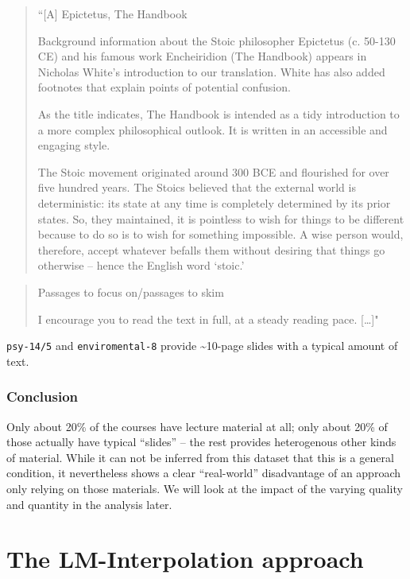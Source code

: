 \documentclass[]{article}
\begin{document}
\begin{quote}
``{[}A{]} Epictetus, The Handbook

Background information about the Stoic philosopher Epictetus (c. 50-130
CE) and his famous work Encheiridion (The Handbook) appears in Nicholas
White's introduction to our translation. White has also added footnotes
that explain points of potential confusion.

As the title indicates, The Handbook is intended as a tidy introduction
to a more complex philosophical outlook. It is written in an accessible
and engaging style.

The Stoic movement originated around 300 BCE and flourished for over
five hundred years. The Stoics believed that the external world is
deterministic: its state at any time is completely determined by its
prior states. So, they maintained, it is pointless to wish for things to
be different because to do so is to wish for something impossible. A
wise person would, therefore, accept whatever befalls them without
desiring that things go otherwise -- hence the English word `stoic.'
\end{quote}

\begin{quote}
Passages to focus on/passages to skim

I encourage you to read the text in full, at a steady reading pace.
{[}\ldots{}{]}"
\end{quote}

\texttt{psy-14/5} and \texttt{enviromental-8} provide
\textasciitilde{}10-page slides with a typical amount of text.

\subsubsection{Conclusion}\label{conclusion}

Only about 20\% of the courses have lecture material at all; only about
20\% of those actually have typical ``slides'' -- the rest provides
heterogenous other kinds of material. While it can not be inferred from
this dataset that this is a general condition, it nevertheless shows a
clear ``real-world'' disadvantage of an approach only relying on those
materials. We will look at the impact of the varying quality and
quantity in the analysis later.

\section{The LM-Interpolation
approach}\label{the-lm-interpolation-approach}
\end{document}
